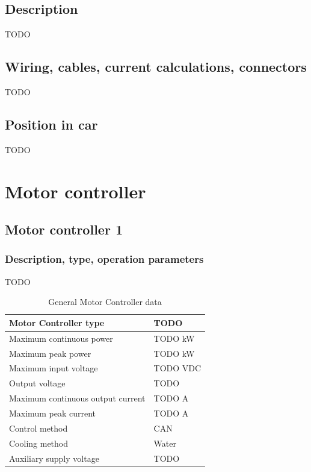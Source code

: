 \documentclass{article}
\begin{document}
\subsection{Description}
TODO

\subsection{Wiring, cables, current calculations, connectors}
TODO

\subsection{Position in car}
TODO


\section{Motor controller}
\subsection{Motor controller 1}
\subsubsection{Description, type, operation parameters}
TODO

\begin{table}[H]
	\centering
	\begin{tabular}{|l|l|}
	\hline
	Motor Controller type & TODO \\ \hline
	Maximum continuous power & TODO kW \\ \hline
	Maximum peak power & TODO kW \\ \hline
	Maximum input voltage & TODO VDC \\ \hline
	Output voltage & TODO \\ \hline
	Maximum continuous output current & TODO A \\ \hline
	Maximum peak current & TODO A \\ \hline
	Control method & CAN \\ \hline
	Cooling method & Water \\ \hline
	Auxiliary supply voltage & TODO \\ \hline
	\end{tabular}
	\caption{General Motor Controller data}
	\label{MC}
\end{table}
\end{document}
